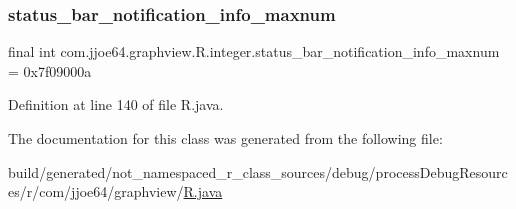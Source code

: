 \subsubsection{\texorpdfstring{status\_bar\_notification\_info\_maxnum}{status\_bar\_notification\_info\_maxnum}}
{\footnotesize\ttfamily final int com.\+jjoe64.\+graphview.\+R.\+integer.\+status\+\_\+bar\+\_\+notification\+\_\+info\+\_\+maxnum = 0x7f09000a\hspace{0.3cm}{\ttfamily [static]}}



Definition at line 140 of file R.\+java.



The documentation for this class was generated from the following file\+:\begin{DoxyCompactItemize}
\item 
build/generated/not\+\_\+namespaced\+\_\+r\+\_\+class\+\_\+sources/debug/process\+Debug\+Resources/r/com/jjoe64/graphview/\mbox{\hyperlink{com_2jjoe64_2graphview_2_r_8java}{R.\+java}}\end{DoxyCompactItemize}
